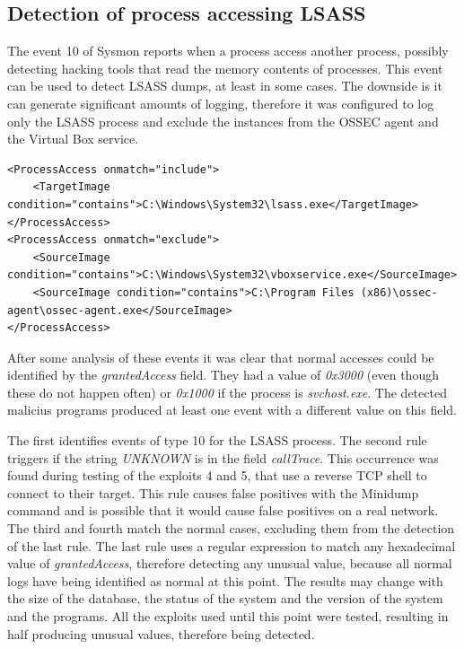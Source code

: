 \subsection{Detection of process accessing LSASS} \label{detect_lsass}
The event 10 of Sysmon reports when a process access another process, possibly detecting hacking tools that read the memory contents of processes\cite{sysmon}.
This event can be used to detect LSASS dumps, at least in some cases\cite{sysmon_event_10_lsass}.
\linej
The downside is it can generate significant amounts of logging, therefore it was configured to log only the LSASS process and exclude the instances from the OSSEC agent and the Virtual Box service.
\linej
\begin{lstlisting}[style=xml,caption=Sysmon monitoring with event 10 for LSASS reads,captionpos=b]
<ProcessAccess onmatch="include">
	<TargetImage condition="contains">C:\Windows\System32\lsass.exe</TargetImage>
</ProcessAccess>
<ProcessAccess onmatch="exclude">
	<SourceImage condition="contains">C:\Windows\System32\vboxservice.exe</SourceImage>
	<SourceImage condition="contains">C:\Program Files (x86)\ossec-agent\ossec-agent.exe</SourceImage>
</ProcessAccess>
\end{lstlisting}
\linej
After some analysis of these events it was clear that normal accesses could be identified by the \textit{grantedAccess} field. They had a value of \textit{0x3000} (even though these do not happen often) or \textit{0x1000} if the process is \textit{svchost.exe}. The detected malicius programs produced at least one event with a different value on this field.
\linej

\linej
The first identifies events of type 10 for the LSASS process.
\linej
The second rule triggers if the string \textit{UNKNOWN} is in the field \textit{callTrace}. This occurrence was found during testing of the exploits 4 and 5, that use a reverse TCP shell to connect to their target. This rule causes false positives with the Minidump command and is possible that it would cause false positives on a real network.
\linej
The third and fourth match the normal cases, excluding them from the detection of the last rule.
\linej
The last rule uses a regular expression to match any hexadecimal value of \textit{grantedAccess}, therefore detecting any unusual value, because all normal logs have being identified as normal at this point.
\linej
\linej
The results may change with the size of the database, the status of the system and the version of the system and the programs.
All the exploits used until this point were tested, resulting in half producing unusual values, therefore being detected.

